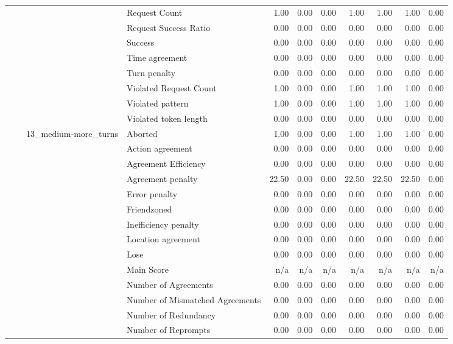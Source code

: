 \begin{tabular}{llllrrrrrrr}
 &  &  & Request Count & 1.00 & 0.00 & 0.00 & 1.00 & 1.00 & 1.00 & 0.00 \\
 &  &  & Request Success Ratio & 0.00 & 0.00 & 0.00 & 0.00 & 0.00 & 0.00 & 0.00 \\
 &  &  & Success & 0.00 & 0.00 & 0.00 & 0.00 & 0.00 & 0.00 & 0.00 \\
 &  &  & Time agreement & 0.00 & 0.00 & 0.00 & 0.00 & 0.00 & 0.00 & 0.00 \\
 &  &  & Turn penalty & 0.00 & 0.00 & 0.00 & 0.00 & 0.00 & 0.00 & 0.00 \\
 &  &  & Violated Request Count & 1.00 & 0.00 & 0.00 & 1.00 & 1.00 & 1.00 & 0.00 \\
 &  &  & Violated pattern & 1.00 & 0.00 & 0.00 & 1.00 & 1.00 & 1.00 & 0.00 \\
 &  &  & Violated token length & 0.00 & 0.00 & 0.00 & 0.00 & 0.00 & 0.00 & 0.00 \\
\cline{3-11}
 &  & \multirow[t]{27}{*}{13_medium-more_turns} & Aborted & 1.00 & 0.00 & 0.00 & 1.00 & 1.00 & 1.00 & 0.00 \\
 &  &  & Action agreement & 0.00 & 0.00 & 0.00 & 0.00 & 0.00 & 0.00 & 0.00 \\
 &  &  & Agreement Efficiency & 0.00 & 0.00 & 0.00 & 0.00 & 0.00 & 0.00 & 0.00 \\
 &  &  & Agreement penalty & 22.50 & 0.00 & 0.00 & 22.50 & 22.50 & 22.50 & 0.00 \\
 &  &  & Error penalty & 0.00 & 0.00 & 0.00 & 0.00 & 0.00 & 0.00 & 0.00 \\
 &  &  & Friendzoned & 0.00 & 0.00 & 0.00 & 0.00 & 0.00 & 0.00 & 0.00 \\
 &  &  & Inefficiency penalty & 0.00 & 0.00 & 0.00 & 0.00 & 0.00 & 0.00 & 0.00 \\
 &  &  & Location agreement & 0.00 & 0.00 & 0.00 & 0.00 & 0.00 & 0.00 & 0.00 \\
 &  &  & Lose & 0.00 & 0.00 & 0.00 & 0.00 & 0.00 & 0.00 & 0.00 \\
 &  &  & Main Score & n/a & n/a & n/a & n/a & n/a & n/a & n/a \\
 &  &  & Number of Agreements & 0.00 & 0.00 & 0.00 & 0.00 & 0.00 & 0.00 & 0.00 \\
 &  &  & Number of Mismatched Agreements & 0.00 & 0.00 & 0.00 & 0.00 & 0.00 & 0.00 & 0.00 \\
 &  &  & Number of Redundancy & 0.00 & 0.00 & 0.00 & 0.00 & 0.00 & 0.00 & 0.00 \\
 &  &  & Number of Reprompts & 0.00 & 0.00 & 0.00 & 0.00 & 0.00 & 0.00 & 0.00 \\

\end{tabular}
